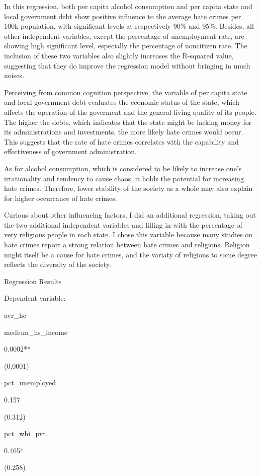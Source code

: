 \documentclass[]{article}
\begin{document}
In this regression, both per capita alcohol consumption and per capita
state and local government debt show positive influence to the average
hate crimes per 100k population, with significant levels at respectively
90\% and 95\%. Besides, all other independent variables, except the
percentage of unemployment rate, are showing high significant level,
especially the percentage of noncitizen rate. The inclusion of these two
variables also slightly increases the R-squared value, suggesting that
they do improve the regression model without bringing in much noises.

Perceiving from common cognition perspective, the variable of per capita
state and local government debt evaluates the economic status of the
state, which affects the operation of the goverment and the general
living quality of its people. The higher the debts, which indicates that
the state might be lacking money for its administrations and
investments, the more likely hate crimes would occur. This suggests that
the rate of hate crimes correlates with the capability and effectiveness
of government administration.

As for alcohol consumption, which is considered to be likely to increase
one's irrationality and tendency to cause chaos, it holds the potential
for increasing hate crimes. Therefore, lower stability of the society as
a whole may also explain for higher occurrance of hate crimes.

Curious about other influencing factors, I did an additional regression,
taking out the two additional independent variables and filling in with
the percentage of very religious people in each state. I chose this
variable because many studies on hate crimes report a strong relation
between hate crimes and religions. Religion might itself be a cause for
hate crimes, and the variaty of religions to some degree reflects the
diversity of the society.

Regression Results

Dependent variable:

avr\_hc

medium\_hs\_income

0.0002**

(0.0001)

pct\_unemployed

0.157

(0.312)

pct\_whi\_pvt

0.465*

(0.258)
\end{document}
